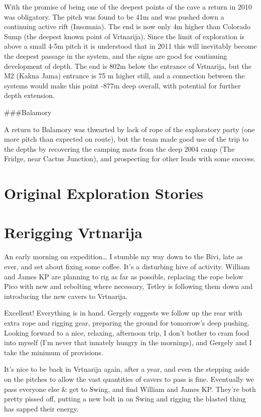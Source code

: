With the promise of being one of the deepest points of the cave a return
in 2010 was obligatory. The pitch was found to be 41m and was pushed
down a continuing active rift (Insomnia). The end is now only 4m higher
than Colorado Sump (the deepest known point of Vrtnarija). Since the
limit of exploration is above a small 4-5m pitch it is understood that
in 2011 this will inevitably become the deepest passage in the system,
and the signs are good for continuing development of depth. The end is
802m below the entrance of Vrtnarija, but the M2 (Kakna Jama) entrance
is 75 m higher still, and a connection between the systems would make
this point -877m deep overall, with potential for further depth
extension.

\#\#\#Balamory

A return to Balamory was thwarted by lack of rope of the exploratory
party (one more pitch than expected on route), but the team made good
use of the trip to the depths by recovering the camping mats from the
deep 2004 camp (The Fridge, near Cactus Junction), and prospecting for
other leads with some success.

\hypertarget{original-exploration-stories}{%
\section{Original Exploration
Stories}\label{original-exploration-stories}}

\hypertarget{rerigging-vrtnarija}{%
\section{Rerigging Vrtnarija}\label{rerigging-vrtnarija}}

An early morning on expedition\ldots{} I stumble my way down to the
Bivi, late as ever, and set about fixing some coffee. It's a disturbing
hive of activity. William and James KP are planning to rig as far as
possible, replacing the rope below Pico with new and rebolting where
necessary, Tetley is following them down and introducing the new cavers
to Vrtnarija.

Excellent! Everything is in hand. Gergely suggests we follow up the rear
with extra rope and rigging gear, preparing the ground for tomorrow's
deep pushing. Looking forward to a nice, relaxing, afternoon trip, I
don't bother to cram food into myself (I'm never that innately hungry in
the mornings), and Gergely and I take the minimum of provisions.

It's nice to be back in Vrtnarija again, after a year, and even the
stepping aside on the pitches to allow the vast quantities of cavers to
pass is fine. Eventually we pass everyone else \& get to Swing, and find
William and James KP. They're both pretty pissed off, putting a new bolt
in on Swing and rigging the blasted thing has sapped their energy.

